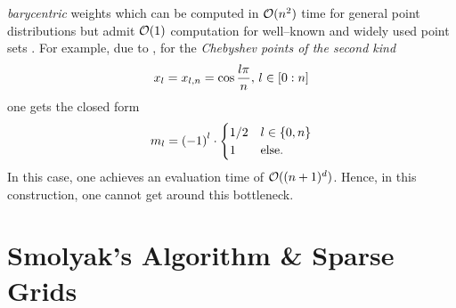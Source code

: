 \documentclass[12pt, oneside]{amsart}
\theoremstyle{definition}
\theoremstyle{remark}
\numberwithin{equation}{section}
\begin{document}
\emph{barycentric} weights which can be computed in \(\cO(n^2)\) time for 
general point distributions but admit \(\cO(1)\) computation for well--known 
and widely used point sets \cite{klimke2004}. For example, due to 
\cite{Berut_2004}, for the \emph{Chebyshev points of the second kind}
\begin{equation}\label{eq:chebyPts2}
	x_l = x_{l, n} = \cos \frac{l \pi}{n},\, l \in \indexset[0]{n}
\end{equation}
one gets the closed form
\begin{equation}\label{eq:weightsChebyshev}
	m_l = {\left(-1\right)}^l \cdot \begin{cases}
		1/2 &l \in \set{0, n}\\
		1 &\text{else.}
	\end{cases}
\end{equation}
In this case, one achieves an evaluation time of \(\cO((n+1)^d)\).
Hence, in this construction, one cannot get around this bottleneck. 

\section{Smolyak's Algorithm \& Sparse Grids}
\end{document}
